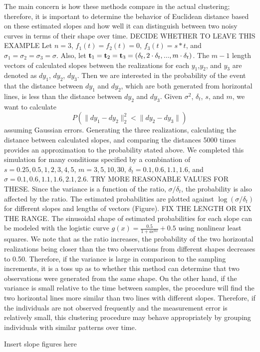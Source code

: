 The main concern is how these methods compare in the actual clustering; therefore, it is important to determine the behavior of Euclidean distance based on these estimated slopes and how well it can distinguish between two noisy curves in terms of their shape over time. DECIDE WHETHER TO LEAVE THIS EXAMPLE Let $n=3$, $f_1(t) = f_2(t) =0$, $f_3(t)=s*t$, and $\sigma_1=\sigma_2=\sigma_3=\sigma$. Also, let $\mathbf t_1 = \mathbf t_2=\mathbf t_3 = (\delta_t,2\cdot\delta_t,...,m\cdot\delta_t)$. The $m-1$ length vectors of calculated slopes between the realizations for each $y_1$,$y_2$, and $y_3$ are denoted as $dy_1$, $dy_2$, $dy_3$. Then we are interested in the probability of the event that the distance between $dy_1$ and $dy_2$, which are both generated from horizontal lines, is less than the distance between $dy_2$ and $dy_3$. Given $\sigma^2$, $\delta_t$, $s$, and $m$, we want to calculate
$$P(\|dy_1-dy_2\|^2_2 < \|dy_2-dy_3\|)$$
assuming Gaussian errors. Generating the three realizations, calculating the distance between calculated slopes, and comparing the distances 5000 times provides an approximation to the probability stated above. We completed this simulation for many conditions specified by a combination of $s = 0.25, 0.5, 1,2,3,4,5$, $m = 3,5,10,30$, $\delta_t = 0.1,0.6,1.1,1.6$, and $\sigma = 0.1,0.6,1.1,1.6,2.1,2.6$. TRY MORE REASONABLE VALUES FOR THESE. Since the variance is a function of the ratio, $\sigma/\delta_t$, the probability is also affected by the ratio. The estimated probabilities are plotted against $\log(\sigma/\delta_t)$ for different slopes and lengths of vectors (Figure). FIX THE LENGTH OR FIX THE RANGE. The sinusoidal shape of estimated probabilities for each slope can be modeled with the logistic curve $g(x) = \frac{0.5}{1+ae^{bx}}+0.5$ using nonlinear least squares. We note that as the ratio increases, the probability of the two horizontal realizations being closer than the two observations from different shapes decreases to 0.50. Therefore, if the variance is large in comparison to the sampling increments, it is a toss up as to whether this method can determine that two observations were generated from the same shape. On the other hand, if the variance is small relative to the time between samples, the procedure will find the two horizontal lines more similar than two lines with different slopes. Therefore, if the individuals are not observed frequently and the measurement error is relatively small, this clustering procedure may behave appropriately by grouping individuals with similar patterns over time. 
\begin{center}
Insert slope figures here
\end{center}


